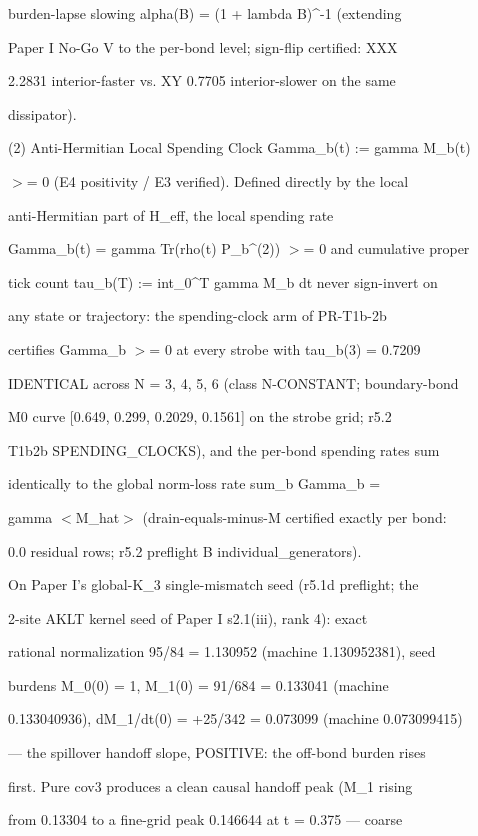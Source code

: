 \documentclass[11pt,a4paper]{article}
\theoremstyle{definition}
\begin{document}
burden-lapse slowing alpha(B) = (1 + lambda B)\^{}{-1} (extending

Paper I No-Go V to the per-bond level; sign-flip certified: XXX

2.2831 interior-faster vs. XY 0.7705 interior-slower on the same

dissipator).


(2) Anti-Hermitian Local Spending Clock Gamma\_b(t) := gamma M\_b(t)

$>$= 0 (E4 positivity / E3 verified). Defined directly by the local

anti-Hermitian part of H\_eff, the local spending rate

Gamma\_b(t) = gamma Tr(rho(t) P\_b\^{}{(2)}) $>$= 0 and cumulative proper

tick count tau\_b(T) := int\_0\^{}T gamma M\_b dt never sign-invert on

any state or trajectory: the spending-clock arm of PR-T1b-2b

certifies Gamma\_b $>$= 0 at every strobe with tau\_b(3) = 0.7209

IDENTICAL across N = 3, 4, 5, 6 (class N-CONSTANT; boundary-bond

M0 curve [0.649, 0.299, 0.2029, 0.1561] on the strobe grid; r5.2

T1b2b SPENDING\_CLOCKS), and the per-bond spending rates sum

identically to the global norm-loss rate sum\_b Gamma\_b =

gamma $<$M\_hat$>$ (drain-equals-minus-M certified exactly per bond:

0.0 residual rows; r5.2 preflight B individual\_generators).


On Paper I's global-K\_3 single-mismatch seed (r5.1d preflight; the

2-site AKLT kernel seed of Paper I s2.1(iii), rank 4): exact

rational normalization 95/84 = 1.130952 (machine 1.130952381), seed

burdens M\_0(0) = 1, M\_1(0) = 91/684 = 0.133041 (machine

0.133040936), dM\_1/dt(0) = +25/342 = 0.073099 (machine 0.073099415)

— the spillover handoff slope, POSITIVE: the off-bond burden rises

first. Pure cov3 produces a clean causal handoff peak (M\_1 rising

from 0.13304 to a fine-grid peak 0.146644 at t = 0.375 — coarse
\end{document}
